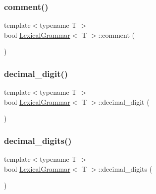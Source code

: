\mbox{\label{class_lexical_grammar_a342d05c7d8f59d5a4d0c7eb34fd97b3f}} 
\subsubsection{\texorpdfstring{comment()}{comment()}}
{\footnotesize\ttfamily template$<$typename T $>$ \\
bool \hyperlink{class_lexical_grammar}{Lexical\+Grammar}$<$ T $>$\+::comment (\begin{DoxyParamCaption}{ }\end{DoxyParamCaption})\hspace{0.3cm}{\ttfamily [inline]}}

\mbox{\label{class_lexical_grammar_a013dbcda735a0c6c61970de8bd65c0fe}} 
\subsubsection{\texorpdfstring{decimal\+\_\+digit()}{decimal\_digit()}}
{\footnotesize\ttfamily template$<$typename T $>$ \\
bool \hyperlink{class_lexical_grammar}{Lexical\+Grammar}$<$ T $>$\+::decimal\+\_\+digit (\begin{DoxyParamCaption}{ }\end{DoxyParamCaption})\hspace{0.3cm}{\ttfamily [inline]}}

\mbox{\label{class_lexical_grammar_a434f04e5a69d078a98dcf9163835dad0}} 
\subsubsection{\texorpdfstring{decimal\+\_\+digits()}{decimal\_digits()}}
{\footnotesize\ttfamily template$<$typename T $>$ \\
bool \hyperlink{class_lexical_grammar}{Lexical\+Grammar}$<$ T $>$\+::decimal\+\_\+digits (\begin{DoxyParamCaption}{ }\end{DoxyParamCaption})\hspace{0.3cm}{\ttfamily [inline]}}

